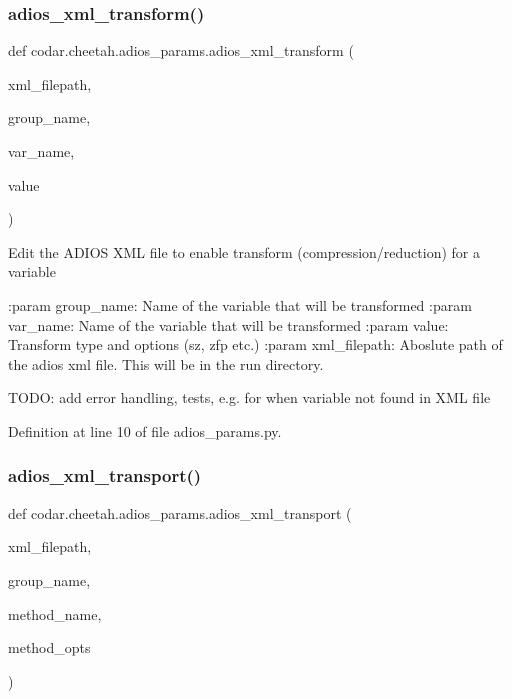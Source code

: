 \subsubsection{\texorpdfstring{adios\+\_\+xml\+\_\+transform()}{adios\_xml\_transform()}}
{\footnotesize\ttfamily def codar.\+cheetah.\+adios\+\_\+params.\+adios\+\_\+xml\+\_\+transform (\begin{DoxyParamCaption}\item[{}]{xml\+\_\+filepath,  }\item[{}]{group\+\_\+name,  }\item[{}]{var\+\_\+name,  }\item[{}]{value }\end{DoxyParamCaption})}

\begin{DoxyVerb}Edit the ADIOS XML file to enable transform (compression/reduction) for a
variable

:param group_name:   Name of the variable that will be transformed
:param var_name:     Name of the variable that will be transformed
:param value:        Transform type and options (sz, zfp etc.)
:param xml_filepath: Aboslute path of the adios xml file. This will be in
                     the run directory.

TODO: add error handling, tests, e.g. for when variable not found in XML
file
\end{DoxyVerb}
 

Definition at line 10 of file adios\+\_\+params.\+py.

\mbox{\label{namespacecodar_1_1cheetah_1_1adios__params_a864ce8fd49004c56565ebcc18c26f2a7}} 
\subsubsection{\texorpdfstring{adios\+\_\+xml\+\_\+transport()}{adios\_xml\_transport()}}
{\footnotesize\ttfamily def codar.\+cheetah.\+adios\+\_\+params.\+adios\+\_\+xml\+\_\+transport (\begin{DoxyParamCaption}\item[{}]{xml\+\_\+filepath,  }\item[{}]{group\+\_\+name,  }\item[{}]{method\+\_\+name,  }\item[{}]{method\+\_\+opts }\end{DoxyParamCaption})}




